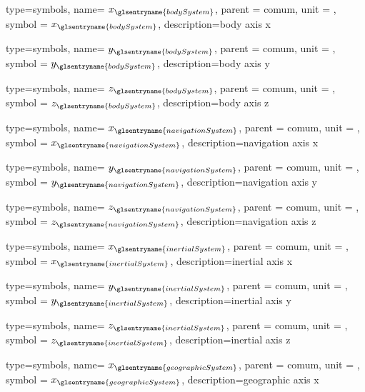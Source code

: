{type=symbols,
  name= \ensuremath{x_{\glsentryname{bodySystem}}},
  parent = {comum},
  unit = \unexpanded{},
  symbol = \ensuremath{x_{\glsentryname{bodySystem}}},
  description={body axis x}
}

{type=symbols,
  name= \ensuremath{y_{\glsentryname{bodySystem}}},
  parent = {comum},
  unit = \unexpanded{},
  symbol = \ensuremath{y_{\glsentryname{bodySystem}}},
  description={body axis y}
}

{type=symbols,
  name= \ensuremath{z_{\glsentryname{bodySystem}}},
  parent = {comum},
  unit = \unexpanded{},
  symbol = \ensuremath{z_{\glsentryname{bodySystem}}},
  description={body axis z}
}



{type=symbols,
  name= \ensuremath{x_{\glsentryname{navigationSystem}}},
  parent = {comum},
  unit = \unexpanded{},
  symbol = \ensuremath{x_{\glsentryname{navigationSystem}}},
  description={navigation axis x}
}

{type=symbols,
  name= \ensuremath{y_{\glsentryname{navigationSystem}}},
  parent = {comum},
  unit = \unexpanded{},
  symbol = \ensuremath{y_{\glsentryname{navigationSystem}}},
  description={navigation axis y}
}

{type=symbols,
  name= \ensuremath{z_{\glsentryname{navigationSystem}}},
  parent = {comum},
  unit = \unexpanded{},
  symbol = \ensuremath{z_{\glsentryname{navigationSystem}}},
  description={navigation axis z}
}



{type=symbols,
  name= \ensuremath{x_{\glsentryname{inertialSystem}}},
  parent = {comum},
  unit = \unexpanded{},
  symbol = \ensuremath{x_{\glsentryname{inertialSystem}}},
  description={inertial axis x}
}

{type=symbols,
  name= \ensuremath{y_{\glsentryname{inertialSystem}}},
  parent = {comum},
  unit = \unexpanded{},
  symbol = \ensuremath{y_{\glsentryname{inertialSystem}}},
  description={inertial axis y}
}

{type=symbols,
  name= \ensuremath{z_{\glsentryname{inertialSystem}}},
  parent = {comum},
  unit = \unexpanded{},
  symbol = \ensuremath{z_{\glsentryname{inertialSystem}}},
  description={inertial axis z}
}

{type=symbols,
  name= \ensuremath{x_{\glsentryname{geographicSystem}}},
  parent = {comum},
  unit = \unexpanded{},
  symbol = \ensuremath{x_{\glsentryname{geographicSystem}}},
  description={geographic axis x}
}

